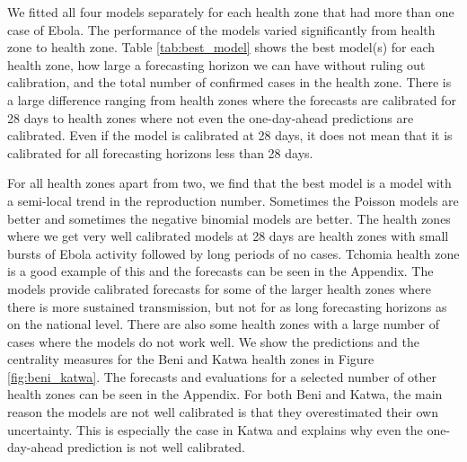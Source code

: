 \documentclass[12pt]{article}
\begin{document}
We fitted all four models separately for each health zone that had more than one case of Ebola. The performance of the models varied significantly from health zone to health zone. Table \ref{tab:best_model} shows the best model(s) for each health zone, how large a forecasting horizon we can have without ruling out calibration, and the total number of confirmed cases in the health zone. There is a large difference ranging from health zones where the forecasts are calibrated for 28 days to health zones where not even the one-day-ahead predictions are calibrated. Even if the model is calibrated at 28 days, it does not mean that it is calibrated for all forecasting horizons less than 28 days. 




For all health zones apart from two, we find that the best model is a model with a semi-local trend in the reproduction number. Sometimes the Poisson models are better and sometimes the negative binomial models are better. The health zones where we get very well calibrated models at 28 days are health zones with small bursts of Ebola activity followed by long periods of no cases. Tchomia health zone is a good example of this and the forecasts can be seen in the Appendix. The models provide calibrated forecasts for some of the larger health zones where there is more sustained transmission, but not for as long forecasting horizons as on the national level. There are also some health zones with a large number of cases where the models do not work well. We show the predictions and the centrality measures for the Beni and Katwa health zones in Figure \ref{fig:beni_katwa}. The forecasts and evaluations for a selected number of other health zones can be seen in the Appendix. For both Beni and Katwa, the main reason the models are not well calibrated is that they overestimated their own uncertainty. This is especially the case in Katwa and explains why even the one-day-ahead prediction is not well calibrated. 
\end{document}
